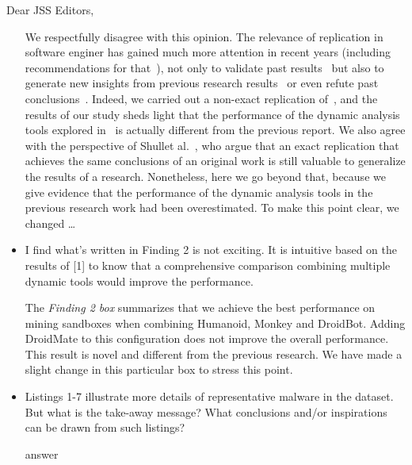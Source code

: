 \documentclass[12pt,english]{scrlttr2}
\begin{document}
\begin{letter}{Dear JSS Editors,}
\begin{itemize}
{\color{blue}{\bf Answer.} We respectfully disagree with this opinion. The relevance of replication in software enginer has gained much more attention in recent years (including recommendations for that~\cite{role-of-replication,standards}),
  not only to validate past results~\cite{msr-replication} but also to generate new insights
  from previous research results~\cite{} or even refute past conclusions~\cite{topas-replication}.
  Indeed, we carried out a non-exact replication of~\cite{}, and the results of our study
  sheds light that the performance of the dynamic analysis tools explored in~\cite{} is
  actually different from the previous report. We also agree with the perspective of Shullet al.~\cite{},
  who argue that an exact replication that achieves the same conclusions of an original work
  is still valuable to generalize the results of a research. Nonetheless, here we go beyond that,
  because we give evidence that the performance of the dynamic analysis tools in the previous research
  work had been overestimated. To make this point clear, we changed \ldots}

\vspace{0.2cm}

\item I find what's written in Finding 2 is not exciting. It is intuitive based on the results of [1] to know that a comprehensive 
comparison combining multiple dynamic tools would improve the performance.


\vspace{0.2cm}

{\color{blue}{\bf Answer.}The \emph{Finding 2 box} summarizes that we achieve the best performance on mining sandboxes when combining Humanoid, Monkey and DroidBot. Adding DroidMate to this configuration does not improve the overall performance. This result is novel and different from the previous research. We have made a slight change in this particular box to stress this point.}

\vspace{0.2cm}

\item Listings 1-7 illustrate more details of representative malware in the dataset. But what is the take-away message? What 
conclusions and/or inspirations can be drawn from such listings?


\vspace{0.2cm}

{\color{blue}{\bf Answer.} answer}

\vspace{0.2cm}


\end{itemize}
\end{letter}
\end{document}
